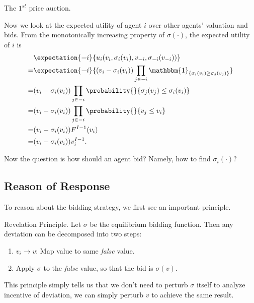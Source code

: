 \begin{prev}
	The \(1^{st}\) price auction.
\end{prev}

Now we look at the expected utility of agent \(i\) over other agents' valuation and bids. From the monotonically increasing property
of \(\sigma(\cdot)\), the expected utility of \(i\) is
\[
	\begin{split}
		&\expectation{-i}{u_{i}(v_{i}, \sigma_{i}(v_{i}), v_{-i}, \sigma_{-i}(v_{-i}))}\\
		= &\expectation{-i}{(v_{i} - \sigma_{i}(v_{i})) \prod\limits_{j\in -i}\mathbbm{1}_{\{ \sigma_{i}(v_{i})\geq \sigma_{j}(v_{j}) \}}}\\
		= &(v_{i} - \sigma_{i}(v_{i}))\prod\limits_{j\in -i}\probability{}{\sigma_{j}(v_{j})\leq \sigma_{i}(v_{i})}\\
		= &(v_{i} - \sigma_{i}(v_{i}))\prod\limits_{j\in -i}\probability{}{v_{j}\leq v_{i}}\\
		= &(v_{i} - \sigma_{i}(v_{i}))F^{I-1}(v_{i})\\
		= &(v_{i} - \sigma_{i}(v_{i}))v_{i}^{I-1}.
	\end{split}
\]

\hr

Now the question is how should an agent bid? Namely, how to find \(\sigma_{i}(\cdot)\)?
\subsection{Reason of Response}
To reason about the bidding strategy, we first see an important principle.
\begin{theorem}
	\label{Revelation-Principle}
	Revelation Principle. Let \(\sigma\) be the equilibrium bidding function. Then any deviation can be decomposed into two steps:
	\begin{enumerate}
		\item \(v_{i}\to v\): Map value to same \emph{false} value.
		\item Apply \(\sigma\) to the \emph{false} value, so that the bid is \(\sigma(v)\).
	\end{enumerate}
\end{theorem}

\begin{intuition}
	This principle simply tells us that we don't need to perturb \(\sigma\) itself to analyze incentive of deviation, we can simply perturb \(v\) to achieve
	the same result.
\end{intuition}

